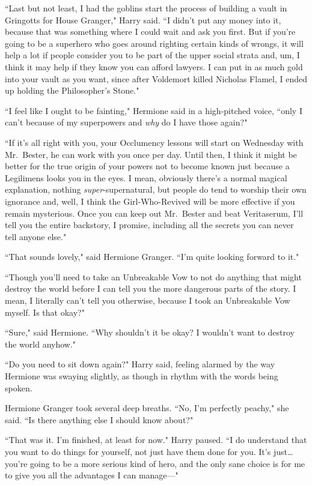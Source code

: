 ``Last but not least, I had the goblins start the process of building a vault in Gringotts for House Granger," Harry said. ``I didn't put any money into it, because that was something where I could wait and ask you first. But if you're going to be a superhero who goes around righting certain kinds of wrongs, it will help a lot if people consider you to be part of the upper social strata and, um, I think it may help if they know you can afford lawyers. I can put in as much gold into your vault as you want, since after Voldemort killed Nicholas Flamel, I ended up holding the Philosopher's Stone."

``I feel like I ought to be fainting," Hermione said in a high-pitched voice, ``only I can't because of my superpowers and \emph{why} do I have those again?"

``If it's all right with you, your Occlumency lessons will start on Wednesday with Mr.~Bester, he can work with you once per day. Until then, I think it might be better for the true origin of your powers not to become known just because a Legilimens looks you in the eyes. I mean, obviously there's a normal magical explanation, nothing \emph{super}-supernatural, but people do tend to worship their own ignorance and, well, I think the Girl-Who-Revived will be more effective if you remain mysterious. Once you can keep out Mr.~Bester and beat Veritaserum, I'll tell you the entire backstory, I promise, including all the secrets you can never tell anyone else."

``That sounds lovely," said Hermione Granger. ``I'm quite looking forward to it."

``Though you'll need to take an Unbreakable Vow to not do anything that might destroy the world before I can tell you the more dangerous parts of the story. I mean, I literally can't tell you otherwise, because I took an Unbreakable Vow myself. Is that okay?"

``Sure," said Hermione. ``Why shouldn't it be okay? I wouldn't want to destroy the world anyhow."

``Do you need to sit down again?" Harry said, feeling alarmed by the way Hermione was swaying slightly, as though in rhythm with the words being spoken.

Hermione Granger took several deep breaths. ``No, I'm perfectly peachy," she said. ``Is there anything else I should know about?"

``That was it. I'm finished, at least for now." Harry paused. ``I do understand that you want to do things for yourself, not just have them done for you. It's just{\ldots} you're going to be a more serious kind of hero, and the only sane choice is for me to give you all the advantages I can manage---"

